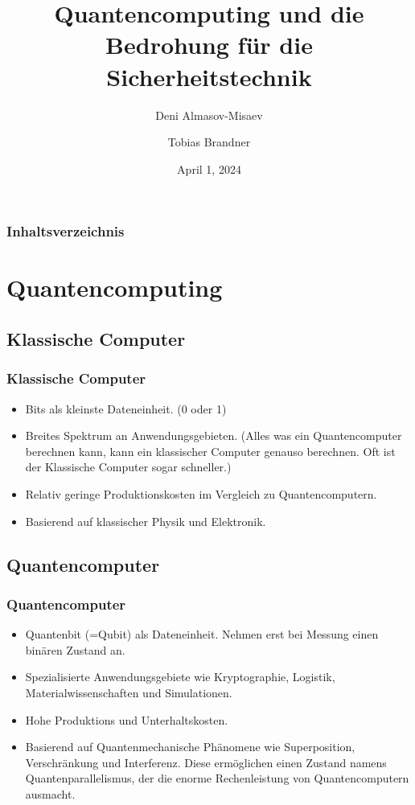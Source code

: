 \documentclass{beamer}
\title{Quantencomputing und die Bedrohung für die Sicherheitstechnik}
\author[shortname]{Deni Almasov-Misaev \and Tobias Brandner}
\institute{Universität Salzburg}
\date{April 1, 2024}
\begin{document}
\maketitle

\begin{frame}
\frametitle{Inhaltsverzeichnis}
\tableofcontents
\end{frame}

\section{Quantencomputing}

\subsection{Klassische Computer}
\begin{frame}
\frametitle{Klassische Computer}

\begin{itemize}
    \item Bits als kleinste Dateneinheit. (0 oder 1)
    \item Breites Spektrum an Anwendungsgebieten. (Alles was ein Quantencomputer berechnen kann, kann ein klassischer Computer genauso berechnen. Oft ist der Klassische Computer sogar schneller.)
    \item Relativ geringe Produktionskosten im Vergleich zu Quantencomputern.
    \item Basierend auf klassischer Physik und Elektronik. 
\end{itemize}

\end{frame}

\subsection{Quantencomputer}
\begin{frame}
\frametitle{Quantencomputer}

\begin{itemize}
    \item Quantenbit (=Qubit) als Dateneinheit. Nehmen erst bei Messung einen binären Zustand an.
    \item Spezialisierte Anwendungsgebiete wie Kryptographie, Logistik, Materialwissenschaften und Simulationen. 
    \item Hohe Produktions und Unterhaltskosten. 
    \item Basierend auf Quantenmechanische Phänomene wie Superposition, Verschränkung und Interferenz. Diese ermöglichen einen Zustand namens Quantenparallelismus, der die enorme Rechenleistung von Quantencomputern ausmacht. 
\end{itemize}

\end{frame}
\end{document}
